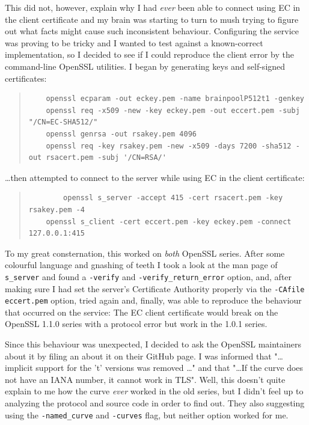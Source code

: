 \documentclass{article}
\begin{document}
This did not, however, explain why I had \emph{ever} been able to connect using EC in the client certificate and my brain was starting to turn to mush trying to figure out what facts might cause such inconsistent behaviour.  Configuring the service was proving to be tricky and I wanted to test against a known-correct implementation, so I decided to see if I could reproduce the client error by the command-line OpenSSL utilities.  I began by generating keys and self-signed certificates:

\begin{quote}
\begin{verbatim}
	openssl ecparam -out eckey.pem -name brainpoolP512t1 -genkey
	openssl req -x509 -new -key eckey.pem -out eccert.pem -subj "/CN=EC-SHA512/"
	openssl genrsa -out rsakey.pem 4096
	openssl req -key rsakey.pem -new -x509 -days 7200 -sha512 -out rsacert.pem -subj '/CN=RSA/'
\end{verbatim}
\end{quote}

\ldots then attempted to connect to the server while using EC in the client certificate:

\begin{quote}
\begin{verbatim}
        openssl s_server -accept 415 -cert rsacert.pem -key rsakey.pem -4
	openssl s_client -cert eccert.pem -key eckey.pem -connect 127.0.0.1:415
\end{verbatim}
\end{quote}

To my great consternation, this worked on \emph{both} OpenSSL series.  After some colourful language and gnashing of teeth I took a look at the man page of \texttt{s_server} and found a \texttt{-verify} and \texttt{-verify_return_error} option, and, after making sure I had set the server's Certificate Authority properly via the \texttt{-CAfile eccert.pem} option, tried again and, finally, was able to reproduce the behaviour that occurred on the service: The EC client certificate would break on the OpenSSL 1.1.0 series with a protocol error but work in the 1.0.1 series.

Since this behaviour was unexpected, I decided to ask the OpenSSL maintainers about it by filing an  about it on their GitHub page.  I was informed that "\ldots implicit support for the 't' versions was removed \ldots" and that "\ldots If the curve does not have an IANA number, it cannot work in TLS".  Well, this doesn't quite explain to me how the curve \emph{ever} worked in the old series, but I didn't feel up to analyzing the protocol and source code in order to find out.  They also suggesting using the \texttt{-named_curve} and \texttt{-curves} flag, but neither option worked for me.
\end{document}
